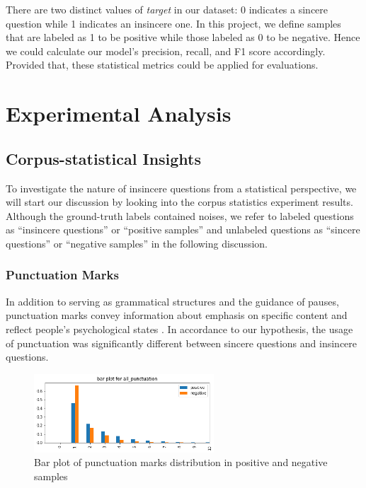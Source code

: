 \documentclass[12pt]{diazessay} %
\begin{document}
There are two distinct values of \textit{target} in our dataset: 0 indicates a sincere question while 1 indicates an insincere one. In this project, we define samples that are labeled as 1 to be positive while those labeled as 0 to be negative. Hence we could calculate our model's precision, recall, and F1 score accordingly. Provided that, these statistical metrics could be applied for evaluations.

\section{Experimental Analysis} %
\label{sec:experimental_analysis}

\subsection{Corpus-statistical Insights} %
\label{ssub:corpus_statistical_insights}

To investigate the nature of insincere questions from a statistical perspective, we will start our discussion by looking into the corpus statistics experiment results. Although the ground-truth labels contained noises, we refer to labeled questions as ``insincere questions'' or ``positive samples'' and unlabeled questions as ``sincere questions'' or ``negative samples'' in the following discussion. 

\subsubsection{Punctuation Marks} %
\label{ssub:punctuation_marks}

In addition to serving as grammatical structures and the guidance of pauses, punctuation marks convey information about emphasis on specific content and reflect people's psychological states \citep{thorndike1948punc}. In accordance to our hypothesis, the usage of punctuation was significantly different between sincere questions and insincere questions. 

\begin{figure}[ht]
    \includegraphics[width=0.6\textwidth, center]{graphs/bar_punc/1.png}
    \caption{Bar plot of punctuation marks distribution in positive and negative samples}
    \label{figure:puncbar}
\end{figure}
\end{document}
